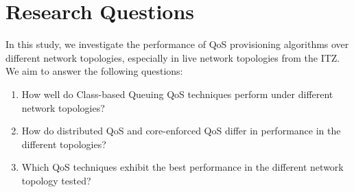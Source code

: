 \section{Research Questions}

In this study, we investigate the performance of QoS provisioning algorithms over different network topologies, especially in live network topologies from the ITZ. We aim to answer the following questions:

\begin{enumerate}
    \item How well do Class-based Queuing QoS techniques perform under different network topologies?
    \item How do distributed QoS and core-enforced QoS differ in performance in the different topologies?
    \item Which QoS techniques exhibit the best performance in the different network topology tested?
\end{enumerate}